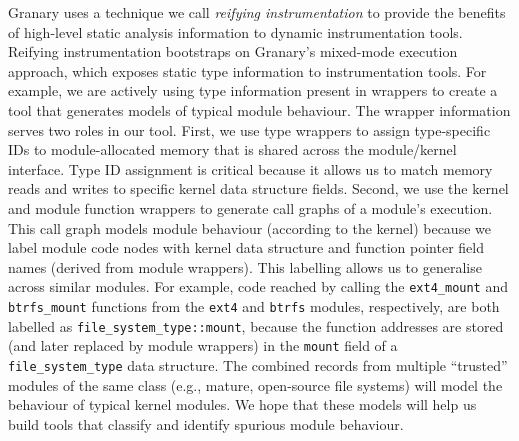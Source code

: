 \documentclass[preprint]{sigplanconf}
\begin{document}
Granary uses a technique we call \emph{reifying instrumentation} to provide the benefits of high-level static analysis information to dynamic instrumentation tools. Reifying instrumentation bootstraps on Granary's mixed-mode execution approach, which exposes static type information to instrumentation tools. For example, we are actively using type information present in wrappers to create a tool that generates models of typical module behaviour. The wrapper information 
serves two roles in our tool. First, we use type wrappers to assign type-specific IDs to module-allocated memory that is shared across the module/kernel interface. Type ID assignment is critical because it allows us to match memory reads and writes to specific kernel data structure fields. Second, we use the kernel and module function wrappers to generate call graphs of a module's execution. This call graph models module behaviour (according to the kernel) because we label module code nodes with kernel data structure and function pointer field names (derived from module wrappers). This labelling allows us to generalise across similar modules. For example, code reached by calling the \texttt{ext4\_mount} and \texttt{btrfs\_mount} functions from the \texttt{ext4} and \texttt{btrfs} modules, respectively, are both labelled as \texttt{file\_system\_type::mount},
 because the function addresses are stored (and later replaced by module wrappers) in the \texttt{mount} field of a \texttt{file\_system\_type} data structure. The combined records from multiple ``trusted'' modules of the same class (e.g., mature, open-source file systems) will model the behaviour of typical kernel modules. We hope that these models will help us build tools that classify and identify spurious module behaviour. 





\end{document}
